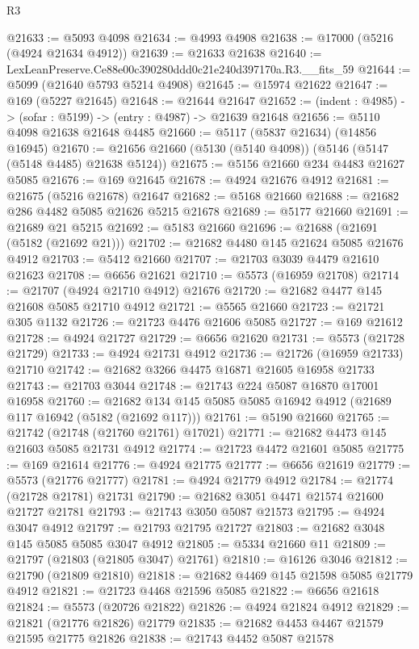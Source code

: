 \begin{lexlean}{R3}
\begin{coremodule}
@21633 := @5093 @4098
@21634 := @4993 @4908
@21638 := @17000 (@5216 (@4924 @21634 @4912))
@21639 := @21633 @21638
@21640 := LexLeanPreserve.Ce88e00c390280ddd0c21e240d397170a.R3.__fits_59
@21644 := @5099 (@21640 @5793 @5214 @4908)
@21645 := @15974 @21622
@21647 := @169 (@5227 @21645)
@21648 := @21644 @21647
@21652 := (indent : @4985) -> (sofar : @5199) -> (entry : @4987) -> @21639 @21648
@21656 := @5110 @4098 @21638 @21648 @4485
@21660 := @5117 (@5837 @21634) (@14856 @16945)
@21670 := @21656 @21660 (@5130 (@5140 @4098)) (@5146 (@5147 (@5148 @4485) @21638 @5124))
@21675 := @5156 @21660 @234 @4483 @21627 @5085
@21676 := @169 @21645
@21678 := @4924 @21676 @4912
@21681 := @21675 (@5216 @21678) @21647
@21682 := @5168 @21660
@21688 := @21682 @286 @4482 @5085 @21626 @5215 @21678
@21689 := @5177 @21660
@21691 := @21689 @21 @5215
@21692 := @5183 @21660
@21696 := @21688 (@21691 (@5182 (@21692 @21)))
@21702 := @21682 @4480 @145 @21624 @5085 @21676 @4912
@21703 := @5412 @21660
@21707 := @21703 @3039 @4479 @21610 @21623
@21708 := @6656 @21621
@21710 := @5573 (@16959 @21708)
@21714 := @21707 (@4924 @21710 @4912) @21676
@21720 := @21682 @4477 @145 @21608 @5085 @21710 @4912
@21721 := @5565 @21660
@21723 := @21721 @305 @1132
@21726 := @21723 @4476 @21606 @5085
@21727 := @169 @21612
@21728 := @4924 @21727
@21729 := @6656 @21620
@21731 := @5573 (@21728 @21729)
@21733 := @4924 @21731 @4912
@21736 := @21726 (@16959 @21733) @21710
@21742 := @21682 @3266 @4475 @16871 @21605 @16958 @21733
@21743 := @21703 @3044
@21748 := @21743 @224 @5087 @16870 @17001 @16958
@21760 := @21682 @134 @145 @5085 @5085 @16942 @4912 (@21689 @117 @16942 (@5182 (@21692 @117)))
@21761 := @5190 @21660
@21765 := @21742 (@21748 (@21760 @21761) @17021)
@21771 := @21682 @4473 @145 @21603 @5085 @21731 @4912
@21774 := @21723 @4472 @21601 @5085
@21775 := @169 @21614
@21776 := @4924 @21775
@21777 := @6656 @21619
@21779 := @5573 (@21776 @21777)
@21781 := @4924 @21779 @4912
@21784 := @21774 (@21728 @21781) @21731
@21790 := @21682 @3051 @4471 @21574 @21600 @21727 @21781
@21793 := @21743 @3050 @5087 @21573
@21795 := @4924 @3047 @4912
@21797 := @21793 @21795 @21727
@21803 := @21682 @3048 @145 @5085 @5085 @3047 @4912
@21805 := @5334 @21660 @11
@21809 := @21797 (@21803 (@21805 @3047) @21761)
@21810 := @16126 @3046
@21812 := @21790 (@21809 @21810)
@21818 := @21682 @4469 @145 @21598 @5085 @21779 @4912
@21821 := @21723 @4468 @21596 @5085
@21822 := @6656 @21618
@21824 := @5573 (@20726 @21822)
@21826 := @4924 @21824 @4912
@21829 := @21821 (@21776 @21826) @21779
@21835 := @21682 @4453 @4467 @21579 @21595 @21775 @21826
@21838 := @21743 @4452 @5087 @21578

\end{coremodule}
\end{lexlean}
